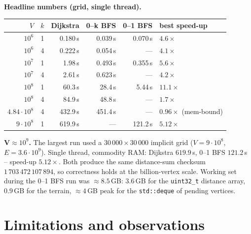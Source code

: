\documentclass[11pt,a4paper]{article}
\begin{document}
\textbf{Headline numbers (grid, single thread).}
\begin{center}
\small
\begin{tabular}{rrrrrl}
\toprule
$V$            & $k$ & Dijkstra & 0--k BFS & 0--1 BFS & best speed-up \\ \midrule
$10^6$         & 1   & 0.180\,s & 0.039\,s & 0.070\,s & $4.6\times$ \\
$10^6$         & 4   & 0.222\,s & 0.054\,s & ---      & $4.1\times$ \\
$10^7$         & 1   & 1.98\,s  & 0.493\,s & 0.355\,s & $5.6\times$ \\
$10^7$         & 4   & 2.61\,s  & 0.623\,s & ---      & $4.2\times$ \\
$10^8$         & 1   & 60.3\,s  & 28.4\,s  & 5.44\,s  & $\mathbf{11.1\times}$ \\
$10^8$         & 4   & 84.9\,s  & 48.8\,s  & ---      & $1.7\times$ \\
$4.84\cdot 10^8$ & 4 & 432.9\,s & 451.4\,s & ---      & $0.96\times$ (mem-bound) \\
$9\cdot 10^8$  & 1   & 619.9\,s & ---      & 121.2\,s & $\mathbf{5.12\times}$ \\
\bottomrule
\end{tabular}
\end{center}

\textbf{V$\approx 10^9$.} The largest run used a $30\,000{\times}30\,000$
implicit grid ($V=9\cdot 10^8$, $E=3.6\cdot 10^9$). Single thread, commodity
RAM: Dijkstra $619.9$\,s, 0--1 BFS $\mathbf{121.2}$\,s -- speed-up
$\mathbf{5.12\times}$. Both produce the same distance-sum checksum
$1\,703\,472\,107\,894$, so correctness holds at the billion-vertex scale.
Working set during the 0--1 BFS run was $\approx 8.5$\,GB: $3.6$\,GB for
the \texttt{uint32\_t} distance array, $0.9$\,GB for the terrain,
$\approx 4$\,GB peak for the \texttt{std::deque} of pending vertices.

\section{Limitations and observations}
\end{document}
